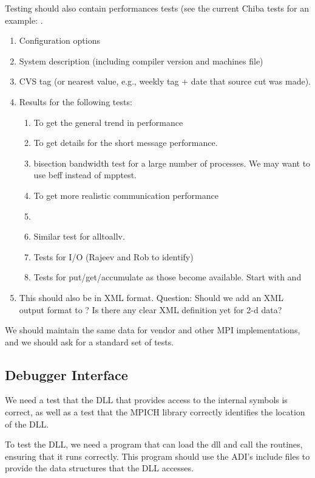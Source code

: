 \documentclass{article}
\begin{document}
Testing should also contain performances tests (see the current Chiba
tests for an example: .
\begin{enumerate}
\item Configuration options
\item System description (including compiler version and machines file)
\item CVS tag (or nearest value, e.g., weekly tag + date that source
cut was made).
\item Results for the following tests:
    \begin{enumerate}
    \item {} To get the general trend in performance
    \item {} To get details for the short message
performance. 
    \item bisection bandwidth test for a large number of processes.
    We may want to use beff instead of mpptest.
    \item {} To get more
    realistic communication performance
    \item {} 
    \item Similar test for alltoallv. 
    \item Tests for I/O (Rajeev and Rob to identify)
    \item Tests for put/get/accumulate as those become available.
    Start with  and 
    \end{enumerate}
\item This should also be in XML format.
    Question: Should we add an XML output format to ?
Is there any clear XML definition yet for 2-d data?

\end{enumerate}
We should maintain the same data for vendor and other MPI
implementations, and we should ask for a standard set of tests.  

\subsection{Debugger Interface}
\label{sec:debug-interface}
We need a test that the DLL that provides access to the internal
symbols is correct, as well as a test that the MPICH library correctly
identifies the location of the DLL.

To test the DLL, we need a program  that can
load the dll and call the routines, ensuring that it runs correctly.
This program should use the ADI's include files to provide the data
structures that the DLL accesses.
\end{document}
